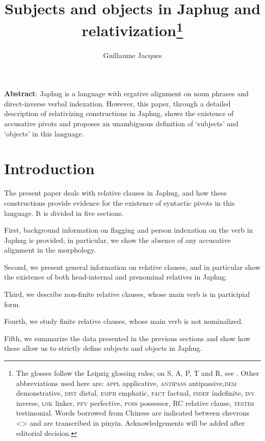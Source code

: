 \documentclass[oldfontcommands,oneside,a4paper,11pt]{article}
\begin{document}
 
\title{Subjects and objects in Japhug and relativization\footnote{
The glosses follow the Leipzig glossing rules; on S, A, P, T and R, see \citet{haspelmath11SAPTR}. Other abbreviations used here are: \textsc{appl} applicative, \textsc{antipass} antipassive,\textsc{dem} demonstrative, \textsc{dist} distal, \textsc{emph} emphatic, \textsc{fact} factual, \textsc{indef} indefinite, \textsc{inv} inverse,  \textsc{lnk} linker, \textsc{pfv} perfective, \textsc{poss} possessor, RC relative clause, \textsc{testim} testimonial. Words borrowed from Chinese are indicated between chevrons <> and are transcribed in pinyin. %
Acknowledgements will be added after editorial decision. %
} }
\author{Guillaume Jacques}
\maketitle
\linenumbers

\textbf{Abstract}: Japhug is a language with ergative alignment on noun phrases and direct-inverse verbal indexation. However, this paper, through  a detailed description of relativizing constructions in Japhug, shows the existence of accusative pivots and proposes an unambiguous definition of `subjects' and `objects' in this language. 


\section{Introduction}
The present paper deals with relative clauses in Japhug, and how these constructions provide evidence for the existence of syntactic pivots in this language. It is divided in five sections.

First, background information on flagging and person indexation on the verb in Japhug is provided; in particular, we show the absence of any accusative alignment in the morphology.

Second, we present general information on relative clauses, and in particular show the existence of both head-internal and prenominal relatives in Japhug.

Third, we describe   non-finite relative clauses, whose main verb is in participial form.

Fourth, we study finite relative clauses,  whose main verb is not nominalized.

Fifth, we summarize the data presented in the previous sections and show how these allow us to strictly define subjects and objects in Japhug.
\end{document}

